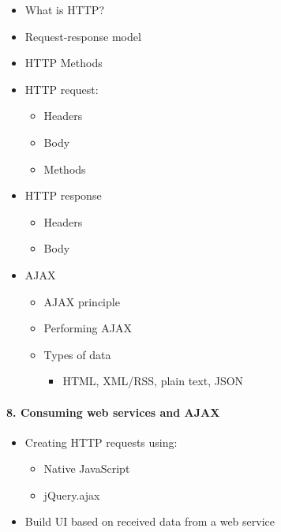 \begin{itemize}
\tightlist
\item
  What is HTTP?
\item
  Request-response model
\item
  HTTP Methods
\item
  HTTP request:

  \begin{itemize}
  \tightlist
  \item
    Headers
  \item
    Body
  \item
    Methods
  \end{itemize}
\item
  HTTP response

  \begin{itemize}
  \tightlist
  \item
    Headers
  \item
    Body
  \end{itemize}
\item
  AJAX

  \begin{itemize}
  \tightlist
  \item
    AJAX principle
  \item
    Performing AJAX
  \item
    Types of data

    \begin{itemize}
    \tightlist
    \item
      HTML, XML/RSS, plain text, JSON
    \end{itemize}
  \end{itemize}
\end{itemize}

\paragraph{8. Consuming web services and
AJAX}\label{consuming-web-services-and-ajax}

\begin{itemize}
\tightlist
\item
  Creating HTTP requests using:

  \begin{itemize}
  \tightlist
  \item
    Native JavaScript
  \item
    jQuery.ajax
  \end{itemize}
\item
  Build UI based on received data from a web service
\end{itemize}

